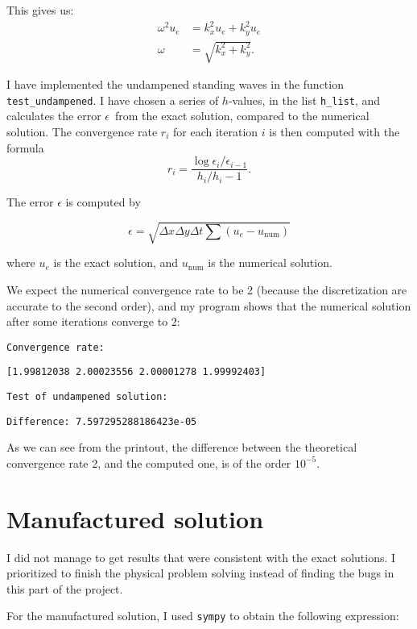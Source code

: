 \documentclass[10pt, a4paper]{amsart}
\numberwithin{figure}{section}
\numberwithin{table}{section}
\begin{document}
This gives us:
\begin{align}
    \omega^2 u_e &= k_x^2 u_e + k_y^2 u_e\\
    \omega &= \sqrt{k_x^2 + k_y^2}.
\end{align}

I have implemented the undampened standing waves in the function
\texttt{test\_undampened}. I have chosen a series of $h$-values, in the list
\texttt{h\_list}, and calculates the error $\epsilon$ from the exact solution, compared to
the numerical solution. The convergence rate $r_i$ for each iteration $i$ is then computed with the formula
\begin{equation}
    r_i = \frac{\log \epsilon_i / \epsilon_{i-1}}{h_i/h_i - 1}.
\end{equation}

The error $\epsilon$ is computed by

\begin{equation}
    \epsilon = \sqrt{\Delta x \Delta y \Delta t \sum (u_e - u_{\text{num}})}
\end{equation}

where $u_e$ is the exact solution, and $u_{\text{num}}$ is the numerical
solution.

We expect the numerical convergence rate to be 2 (because the discretization
are accurate to the second order), and my program shows that the numerical
solution after some iterations converge to 2:

\texttt{Convergence rate:}

\texttt{[1.99812038 2.00023556 2.00001278 1.99992403]}

\texttt{Test of undampened solution:}

\texttt{Difference: 7.597295288186423e-05}

As we can see from the printout, the difference between the theoretical
convergence rate 2, and the computed one, is of the order $10^{-5}$.

\section{Manufactured solution}

I did not manage to get results that were consistent with the exact solutions.
I prioritized to finish the physical problem solving instead of finding the
bugs in this part of the project.

For the manufactured solution, I used \texttt{sympy} to obtain the following
expression:
\end{document}
